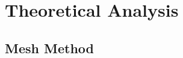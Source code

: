 \section{Theoretical Analysis}
\label{sec:analysis}

\subsection{Mesh Method}
\label{subsec:mesh}






